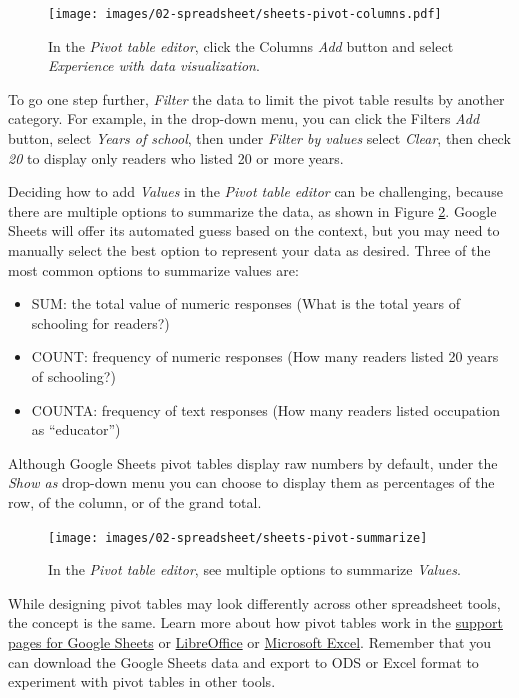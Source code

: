 \documentclass[
  english,
]{book}
\providecommand{\tightlist}{%
  \setlength{\itemsep}{0pt}\setlength{\parskip}{0pt}}
\begin{document}
\begin{figure}
\centering
\texttt{[image: images/02-spreadsheet/sheets-pivot-columns.pdf]}
\caption{\label{fig:sheets-pivot-columns}In the \emph{Pivot table editor}, click the Columns \emph{Add} button and select \emph{Experience with data visualization}.}
\end{figure}

To go one step further, \emph{Filter} the data to limit the pivot table results by another category. For example, in the drop-down menu, you can click the Filters \emph{Add} button, select \emph{Years of school}, then under \emph{Filter by values} select \emph{Clear}, then check \emph{20} to display only readers who listed 20 or more years.

Deciding how to add \emph{Values} in the \emph{Pivot table editor} can be challenging, because there are multiple options to summarize the data, as shown in Figure \ref{fig:sheets-pivot-summarize}. Google Sheets will offer its automated guess based on the context, but you may need to manually select the best option to represent your data as desired. Three of the most common options to summarize values are:

\begin{itemize}
\tightlist
\item
  SUM: the total value of numeric responses (What is the total years of schooling for readers?)
\item
  COUNT: frequency of numeric responses (How many readers listed 20 years of schooling?)
\item
  COUNTA: frequency of text responses (How many readers listed occupation as ``educator'')
\end{itemize}

Although Google Sheets pivot tables display raw numbers by default, under the \emph{Show as} drop-down menu you can choose to display them as percentages of the row, of the column, or of the grand total.



\begin{figure}
\texttt{[image: images/02-spreadsheet/sheets-pivot-summarize]} \caption{In the \emph{Pivot table editor}, see multiple options to summarize \emph{Values}.}\label{fig:sheets-pivot-summarize}
\end{figure}

While designing pivot tables may look differently across other spreadsheet tools, the concept is the same. Learn more about how pivot tables work in the \href{https://support.google.com/docs/topic/9054603}{support pages for Google Sheets} or \href{https://help.libreoffice.org/Calc/Creating_Pivot_Tables}{LibreOffice} or \href{https://support.microsoft.com/en-us/office/create-a-pivottable-to-analyze-worksheet-data-a9a84538-bfe9-40a9-a8e9-f99134456576}{Microsoft Excel}. Remember that you can download the Google Sheets data and export to ODS or Excel format to experiment with pivot tables in other tools.
\end{document}
